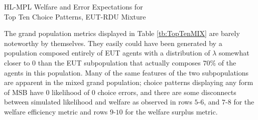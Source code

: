 \documentclass[../main.tex]{subfiles}
\begin{document}
\begin{table}[ht]
	\centering
	\caption{HL-MPL Welfare and Error Expectations for\\Top Ten Choice Patterns, EUT-RDU Mixture}
	\label{tb:TopTenMIX}
	\begin{adjustbox}{width=1\textwidth}
	\end{adjustbox}
\end{table}

The grand population metrics displayed in Table \ref{tb:TopTenMIX} are barely noteworthy by themselves.
They easily could have been generated by a population composed entirely of EUT agents with a distribution of $\lambda$ somewhat closer to $0$ than the EUT subpopulation that actually composes $70\%$ of the agents in this population.
Many of the same features of the two subpopulations are apparent in the mixed grand population;
choice patterns displaying any form of MSB have $0$ likelihood of $0$ choice errors, and there are some disconnects between simulated likelihood and welfare as observed in rows $5$-$6$, and $7$-$8$ for the welfare efficiency metric and rows $9$-$10$ for the welfare surplus metric.
\end{document}
